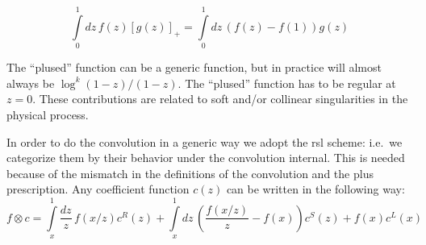 \begin{equation}
  \int\limits_0^1 \!dz\, f(z) \left[g(z)\right]_+ = \int\limits_0^1\!dz\, \left(f(z) - f(1)\right)g(z)
\end{equation}

The \enquote{plused} function can be a generic function, but in practice will
almost always be $\log^k(1-z)/(1-z)$.
The \enquote{plused} function has to be regular at $z=0$.
These contributions are related to soft and/or collinear singularities in the
physical process.

In order to do the convolution in a generic way we adopt the \acrfull{rsl}
scheme: i.e.\ we categorize them by their behavior under the convolution
internal.
%
This is needed because of the mismatch in the definitions of the convolution
and the plus prescription. Any coefficient function $c(z)$ can be written
in the following way:
\begin{equation}
  f \otimes c = \int\limits_x^1 \! \frac{dz}{z} \, f(x/z) c^R(z) + \int\limits_x^1 \! dz \, \left(\frac{f(x/z)}{z} - f(x)\right) c^S(z) + f(x) c^L(x)
\end{equation}

